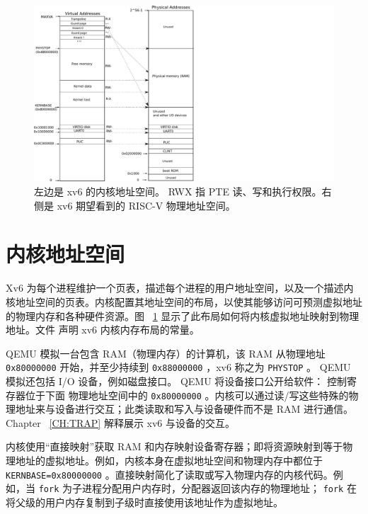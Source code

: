 \documentclass[UTF8]{article}
\begin{document}
   \begin{figure}[h]
\centering
 \includegraphics[scale=0.65]{fig/xv6_layout.pdf}
\caption{左边是 xv6 的内核地址空间。
  {    \sf       \small{RWX}      }  指 PTE 读、写和执行权限。右侧是 xv6 期望看到的 RISC-V 物理地址空间。  }
\label{fig:xv6_layout}
\end{figure}   
    \section{内核地址空间  }    Xv6 为每个进程维护一个页表，描述每个进程的用户地址空间，以及一个描述内核地址空间的页表。内核配置其地址空间的布局，以使其能够访问可预测虚拟地址的物理内存和各种硬件资源。图~    \ref{fig:xv6_layout}    显示了此布局如何将内核虚拟地址映射到物理地址。文件
        声明 xv6 内核内存布局的常量。  

QEMU 模拟一台包含 RAM（物理内存）的计算机，该 RAM 从物理地址    \texttt{0x80000000}    开始，并至少持续到    \texttt{0x88000000}    ，xv6 称之为    \texttt{PHYSTOP}    。 QEMU 模拟还包括 I/O 设备，例如磁盘接口。 QEMU 将设备接口公开给软件：
        控制寄存器位于下面
 物理地址空间中的    \texttt{0x80000000}   。内核可以通过读/写这些特殊的物理地址来与设备进行交互；此类读取和写入与设备硬件而不是 RAM 进行通信。 Chapter~    \ref{CH:TRAP}    解释展示 xv6 与设备的交互。  

内核使用“直接映射”获取 RAM 和内存映射设备寄存器；即将资源映射到等于物理地址的虚拟地址。例如，内核本身在虚拟地址空间和物理内存中都位于    \lstinline{KERNBASE=0x80000000}   。直接映射简化了读取或写入物理内存的内核代码。例如，当   \lstinline{fork}   为子进程分配用户内存时，分配器返回该内存的物理地址；
    \lstinline{fork}    在将父级的用户内存复制到子级时直接使用该地址作为虚拟地址。  
\end{document}
